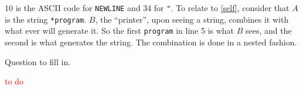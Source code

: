 10 is the ASCII code for \texttt{NEWLINE} and 34 for \texttt{"}. To relate to \ref{self}, consider that $A$ is the string \texttt{*program}. $B$, the ``printer'', upon seeing a string, combines it with what ever will generate it. So the first \texttt{program} in line 5 is what $B$ sees, and the second is what generates the string. The combination is done in a nested fashion.

\setcounter{exercise}{10}

\begin{exercise}
  Question to fill in.
\end{exercise}

\textcolor{red}{to do}
